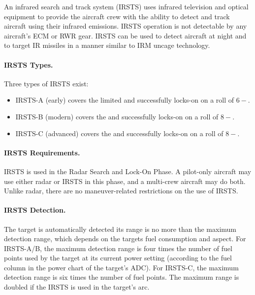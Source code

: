 \begin{advancedrules}
{An infrared search and track system (IRSTS) uses infrared television and optical equipment to provide the aircraft crew with the ability to detect and track aircraft using their infrared emissions. IRSTS operation is not detectable by any aircraft’s ECM or RWR gear. IRSTS can be used to detect aircraft at night and to target IR missiles in a manner similar to IRM uncage technology.

\paragraph{IRSTS Types.} Three types of IRSTS exist: 
\begin{itemize}
    \item IRSTS-A (early) covers the limited  and successfully locks-on on a roll of $6-$.
    \item IRSTS-B (modern) covers the   and successfully locks-on on a roll of $8-$.
    \item IRSTS-C (advanced) covers the   and successfully locks-on on a roll of $8-$.
    
\end{itemize}

\paragraph{IRSTS Requirements.}  IRSTS is used in the Radar Search and Lock-On Phase. A pilot-only aircraft may use either radar or IRSTS in this phase, and a multi-crew aircraft may do both. Unlike radar, there are no maneuver-related restrictions on the use of IRSTS.

\paragraph{IRSTS Detection.} The target is automatically detected its range is no more than the maximum detection range, which depends on the targets fuel consumption and aspect. For IRSTS-A/B, the maximum detection range is four times the number of fuel points used by the target at its current power setting (according to the fuel column in the power chart of the target’s ADC). For IRSTS-C, the maximum detection range is six times the number of fuel points. The maximum range is doubled if the IRSTS is used in the target’s  arc. 

}
\end{advancedrules}
